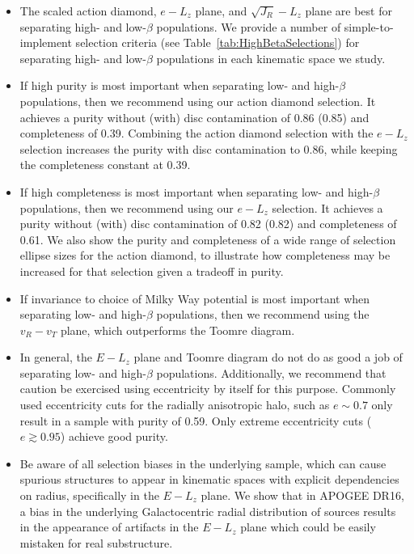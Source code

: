 \begin{itemize}
    \item The scaled action diamond, $e-L_{z}$ plane, and $\sqrt{J_{R}}-L_{z}$ plane are best for separating high- and low-$\beta$ populations. We provide a number of simple-to-implement selection criteria (see Table~\ref{tab:HighBetaSelections}) for separating high- and low-$\beta$ populations in each kinematic space we study.
    
	\item If high purity is most important when separating low- and high-$\beta$ populations, then we recommend using our action diamond selection. It achieves a purity without (with) disc contamination of 0.86 (0.85) and completeness of 0.39. Combining the action diamond selection with the $e-L_{z}$ selection increases the purity with disc contamination to 0.86, while keeping the completeness constant at 0.39.
    
    \item If high completeness is most important when separating low- and high-$\beta$ populations, then we recommend using our $e-L_{z}$ selection. It achieves a purity without (with) disc contamination of 0.82 (0.82) and completeness of 0.61. We also show the purity and completeness of a wide range of selection ellipse sizes for the action diamond, to illustrate how completeness may be increased for that selection given a tradeoff in purity.
   
    \item If invariance to choice of Milky Way potential is most important when separating low- and high-$\beta$ populations, then we recommend using the $v_{R}-v_{T}$ plane, which outperforms the Toomre diagram.
    
    \item In general, the $E-L_{z}$ plane and Toomre diagram do not do as good a job of separating low- and high-$\beta$ populations. Additionally, we recommend that caution be exercised using eccentricity by itself for this purpose. Commonly used eccentricity cuts for the radially anisotropic halo, such as $e\sim0.7$ only result in a sample with purity of 0.59. Only extreme eccentricity cuts ($e \gtrsim 0.95$) achieve good purity.
    
    \item Be aware of all selection biases in the underlying sample, which can cause spurious structures to appear in kinematic spaces with explicit dependencies on radius, specifically in the $E-L_{z}$ plane. We show that in APOGEE DR16, a bias in the underlying Galactocentric radial distribution of sources results in the appearance of artifacts in the $E-L_{z}$ plane which could be easily mistaken for real substructure.
\end{itemize}


